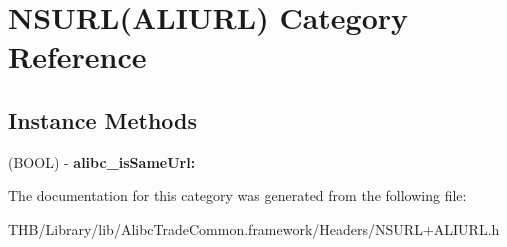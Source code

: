 \hypertarget{category_n_s_u_r_l_07_a_l_i_u_r_l_08}{}\section{N\+S\+U\+RL(A\+L\+I\+U\+RL) Category Reference}
\label{category_n_s_u_r_l_07_a_l_i_u_r_l_08}
\subsection*{Instance Methods}
\begin{DoxyCompactItemize}
\item 
\mbox{\label{category_n_s_u_r_l_07_a_l_i_u_r_l_08_a8eae6a7f323da9730463b1c6d2a49f25}} 
(B\+O\+OL) -\/ {\bfseries alibc\+\_\+is\+Same\+Url\+:}
\end{DoxyCompactItemize}


The documentation for this category was generated from the following file\+:\begin{DoxyCompactItemize}
\item 
T\+H\+B/\+Library/lib/\+Alibc\+Trade\+Common.\+framework/\+Headers/N\+S\+U\+R\+L+\+A\+L\+I\+U\+R\+L.\+h\end{DoxyCompactItemize}
